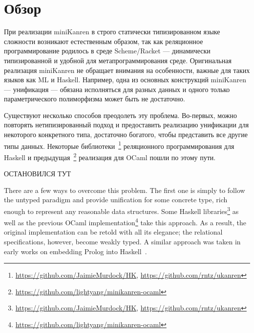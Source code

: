 
\section{Обзор}
\label{sec:relworks}

При реализации miniKanren в строго статически типизированном языке сложности возникают естественным образом, так как реляционное программирование родилось в среде Scheme/Racket --- динамически типизированной и удобной для метапрограммирования среде.
Оригинальная реализация miniKanren не обращает внимания на особенности, важные для таких языков как ML и Haskell.
Например, одна из основных конструкций miniKanren --- унификация --- обязана исполняться для разных данных и одного только параметрического полиморфизма может быть не достаточно.


Существуют несколько способов преодолеть эту проблема.
Во-первых, можно повторять нетипизированный подход и предоставить реализацию унификации для некоторого конкретного типа, достаточно богатого, чтобы представить все другие типы данных.
Некоторые библиотеки~\footnote{\url{https://github.com/JaimieMurdock/HK}, \url{https://github.com/rntz/ukanren}} реляционного программирования для Haskell и предыдущая~\footnote{\url{https://github.com/lightyang/minikanren-ocaml}} реализация для OCaml  пошли по этому пути.

ОСТАНОВИЛСЯ ТУТ

There are a few ways to overcome this problem. The first one is simply to follow the untyped paradigm and
provide unification for some concrete type, rich enough to represent any reasonable data structures.
Some Haskell \miniKanren libraries\footnote{\url{https://github.com/JaimieMurdock/HK}, \url{https://github.com/rntz/ukanren}}
as well as the previous OCaml implementation\footnote{\url{https://github.com/lightyang/minikanren-ocaml}} take this approach.
As a result, the original implementation can be retold with all its elegance; the relational specifications, however,
become weakly typed. A similar approach was taken in early works on embedding Prolog into Haskell~\cite{PrologInHaskell}.

